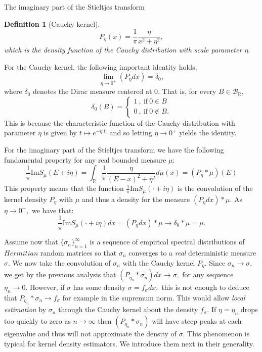 \documentclass[11pt, a4paper, oneside]{book}
\numberwithin{equation}{chapter}
\newtheorem{definition}{Definition}[section]
\begin{document}
\begin{section}{The imaginary part of the Stieltjes transform}
\begin{definition}[Cauchy kernel]
\[
P_\eta (x) = \frac{1}{\pi} \frac{\eta}{x^2+\eta^2},
\]
%
which is the density function of the Cauchy distribution with scale parameter $\eta.$
\end{definition}
%
For the Cauchy kernel, the following important identity holds:
\[
\lim \limits_{\eta \to 0^+} (P_\eta dx) = \delta_0,
\]
where $\delta_0$ denotes the Dirac measure centered at 0. That is, for every $B \in \mathcal{B}_{\mathbb{R}},$
\[
\delta_0(B) = \begin{cases}
    1 \ , \ \text{if} \ 0 \in B \\
    0 \ , \ \text{if} \ 0 \notin B.
\end{cases}
\]
%
This is because the characteristic function of the Cauchy distribution with parameter $\eta$ is given by $t \mapsto e^{-\eta |t|}$ and so letting $\eta \to 0^+$ yields the identity.

For the imaginary part of the Stieltjes transform we have the following fundamental property for any real bounded measure $\mu$:
\[
\frac{1}{\pi} \mathrm{Im} S_\mu(E+i\eta) = \int_{\mathbb{R}} \frac{1}{\pi} \frac{\eta}{(E-x)^2 + \eta^2} d\mu(x) = (P_\eta \ast \mu)(E)
\]
This property means that the function $\frac{1}{\pi}\mathrm{Im}S_\mu(\cdot + i \eta)$ is the convolution of the kernel density $P_\eta$ with $\mu$ and thus a density for the measure $(P_\eta dx ) \ast \mu.$ As $\eta \to 0^+,$ we have that:
\[
\frac{1}{\pi} \mathrm{Im} S_\mu(\cdot+i\eta)dx = (P_\eta dx) \ast \mu \to \delta_0 \ast \mu = \mu .
\]

Assume now that $\{ \sigma_n \}_{n=1}^\infty$ is a sequence of empirical spectral distributions of $\textit{Hermitian}$ random matrices so that $\sigma_n$ converges to a \textit{real} deterministic measure $\sigma$. We now take the convolution of $\sigma_n$ with the Cauchy kernel $P_\eta.$ Since $\sigma_n \to \sigma,$ we get by the previous analysis that $(P_{\eta_n} \ast \sigma_n)dx \to \sigma ,$ for any sequence $\eta_n \to 0.$ However, if $\sigma$ has some density $\sigma = f_\sigma dx,$ this is not enough to deduce that $P_{\eta_n} \ast \sigma_n \to f_\sigma$ for example in the supremum norm. This would allow \textit{local estimation} by $\sigma_n$ through the Cauchy kernel about the density $f_\sigma .$ If $\eta = \eta_n$ drops too quickly to zero as $n \to \infty$ then $(P_{\eta_n} \ast \sigma_n)$ will have steep peaks at each eigenvalue and thus will not approximate the density of $\sigma.$ This phenomenon is typical for kernel density estimators. We introduce them next in their generality.


\end{section}
\end{document}

